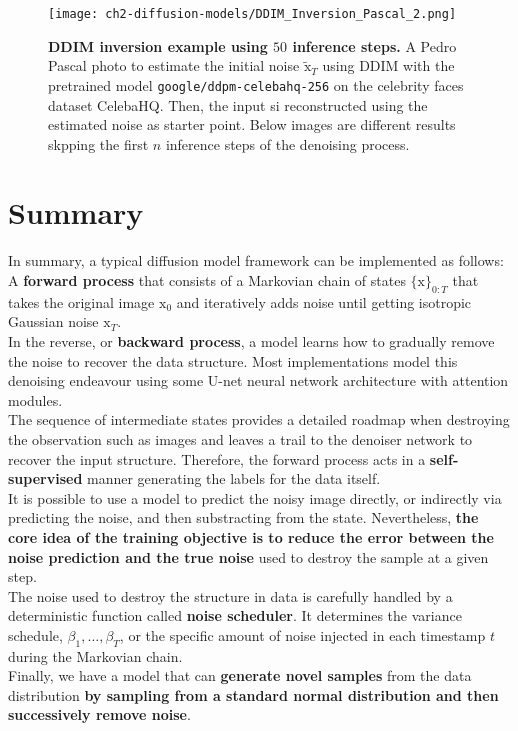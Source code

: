 \begin{figure}[ht]
    \centering
    \texttt{[image: ch2-diffusion-models/DDIM\_Inversion\_Pascal\_2.png]}
    \captionsetup{width=\textwidth} %
    \caption{\textbf{DDIM inversion example using $50$ inference steps.} A Pedro Pascal photo to estimate the initial noise $\tilde{\mathrm{x}}_T$ using DDIM with the pretrained model \texttt{google/ddpm-celebahq-256} on the celebrity faces dataset CelebaHQ. Then, the input si reconstructed using the estimated noise as starter point. Below images are different results skpping the first $n$ inference steps of the denoising process.}
    \label{fig:ddim-inversion-pascal}
  \end{figure}

\section{Summary}

In summary, a typical diffusion model framework can be implemented as follows:\\

\noindent A \textbf{forward process} that consists of a Markovian chain of states $\{\mathrm{x}\}_{0:T}$ that takes the original image $\mathrm{x}_0$ and iteratively adds noise until getting isotropic Gaussian noise $\mathrm{x}_{T}$. \\

\noindent In the reverse, or \textbf{backward process}, a model learns how to gradually remove the noise to recover the data structure. Most implementations model this denoising endeavour using some U-net neural network architecture with attention modules. \\

\noindent The sequence of intermediate states provides a detailed roadmap when destroying the observation such as images and leaves a trail to the denoiser network to recover the input structure. Therefore, the forward process acts in a \textbf{self-supervised} manner generating the labels for the data itself. \\

\noindent It is possible to use a model to predict the noisy image directly, or indirectly via predicting the noise, and then substracting from the state. Nevertheless, \textbf{the core idea of the training objective is to reduce the error between the noise prediction and the true noise} used to destroy the sample at a given step. \\

\noindent The noise used to destroy the structure in data is carefully handled by a deterministic function called \textbf{noise scheduler}. It determines the variance schedule, $\beta_{1}, \dots, \beta_{T}$, or the specific amount of noise injected in each timestamp $t$ during the Markovian chain. \\

\noindent Finally, we have a model that can \textbf{generate novel samples} from the data distribution \textbf{by sampling from a standard normal distribution and then 
successively remove noise}.
